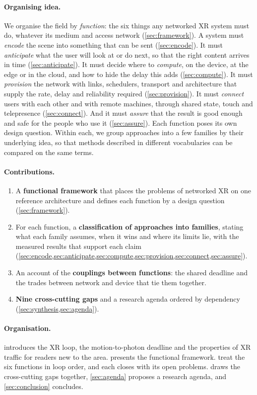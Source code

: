 \paragraph{Organising idea.} We organise the field by \emph{function}: the six things any networked XR
system must do, whatever its medium and access network (\cref{sec:framework}). A system must
\emph{encode} the scene into something that can be sent (\cref{sec:encode}). It must \emph{anticipate}
what the user will look at or do next, so that the right content arrives in time (\cref{sec:anticipate}).
It must decide where to \emph{compute}, on the device, at the edge or in the cloud, and how to hide the
delay this adds (\cref{sec:compute}). It must \emph{provision} the network with links, schedulers,
transport and architecture that supply the rate, delay and reliability required (\cref{sec:provision}).
It must \emph{connect} users with each other and with remote machines, through shared state, touch and
telepresence (\cref{sec:connect}). And it must \emph{assure} that the result is good enough and safe for
the people who use it (\cref{sec:assure}). Each function poses its own design question. Within each, we
group approaches into a few families by their underlying idea, so that methods described in different
vocabularies can be compared on the same terms.

\paragraph{Contributions.}
\begin{enumerate}[leftmargin=*,label=(\arabic*)]
  \item A \textbf{functional framework} that places the problems of networked XR on one reference
        architecture and defines each function by a design question (\cref{sec:framework}).
  \item For each function, a \textbf{classification of approaches into families}, stating what each
        family assumes, when it wins and where its limits lie, with the measured results that support each
        claim (\cref{sec:encode,sec:anticipate,sec:compute,sec:provision,sec:connect,sec:assure}).
  \item An account of the \textbf{couplings between functions}: the shared deadline and the trades
        between network and device that tie them together.
  \item \textbf{Nine cross-cutting gaps} and a research agenda ordered by dependency
        (\cref{sec:synthesis,sec:agenda}).
\end{enumerate}

\paragraph{Organisation.}  introduces the XR loop, the motion-to-photon deadline
and the properties of XR traffic for readers new to the area.  presents the
functional framework. 
treat the six functions in loop order, and each closes with its open problems. 
draws the cross-cutting gaps together, \cref{sec:agenda} proposes a research agenda, and
\cref{sec:conclusion} concludes.
